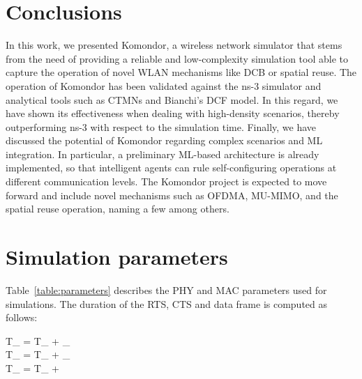 \documentclass[conference]{IEEEtran}
\DeclarePairedDelimiter{\ceil}{\lceil}{\rceil}
\begin{document}
	\section{Conclusions}
	\label{section:conclusions}
	In this work, we presented Komondor, a wireless network simulator that stems from the need of providing a reliable and low-complexity simulation tool able to capture the operation of novel WLAN mechanisms like DCB or spatial reuse. The operation of Komondor has been validated against the ns-3 simulator and analytical tools such as CTMNs and Bianchi's DCF model. In this regard, we have shown its effectiveness when dealing with high-density scenarios, thereby outperforming ns-3 with respect to the simulation time. Finally, we have discussed the potential of Komondor regarding complex scenarios and ML integration. In particular, a preliminary ML-based architecture is already implemented, so that intelligent agents can rule self-configuring operations at different communication levels. The Komondor project is expected to move forward and include novel mechanisms such as OFDMA, MU-MIMO, and the spatial reuse operation, naming a few among others.
	
	
	
	\appendix
	
	\section{Simulation parameters}
	\label{section:appendix_a}
	
	Table~\ref{table:parameters} describes the PHY and MAC parameters used for simulations. The duration of the RTS, CTS and data frame is computed as follows:
	
	\begin{flalign*}
	T_ = T_{} +  \sigma_  \text{,} \\
	T_ = T_{} +  \sigma_ \text{,} \\
	T_ = T_{} +  \sigma {}
	\end{flalign*}
	
\end{document}
